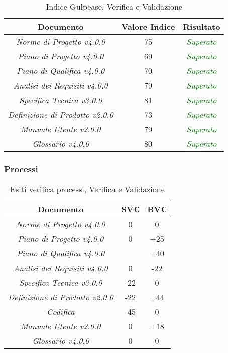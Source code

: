 \begin{table}[h]
	\begin{tabular}{|c|c|c|}
		\hline 
		\textbf{Documento} & \textbf{Valore Indice} & \textbf{Risultato} \\ 
		\hline
		\textit{Norme di Progetto v4.0.0} & 75 & \textcolor{green}{\textit{Superato}} \\  
		\textit{Piano di Progetto v4.0.0} & 69 & \textcolor{green}{\textit{Superato}} \\ 
		\textit{Piano di Qualifica v4.0.0} & 70 & \textcolor{green}{\textit{Superato}} \\ 
		\textit{Analisi dei Requisiti v4.0.0} & 79 & \textcolor{green}{\textit{Superato}} \\
		\textit{Specifica Tecnica v3.0.0} & 81 & \textcolor{green}{\textit{Superato}} \\ 
		\textit{Definizione di Prodotto v2.0.0} & 73 & \textcolor{green}{\textit{Superato}} \\ 
		\textit{Manuale Utente v2.0.0} & 79 & \textcolor{green}{\textit{Superato}} \\ 
		\textit{Glossario v4.0.0} & 80 & \textcolor{green}{\textit{Superato}} \\ 
		\hline 
	\end{tabular}
	\caption{Indice Gulpease, Verifica e Validazione}
\end{table}

\newpage

\subsubsection{Processi}
\label{appendice 9}
\vspace{3mm}

\begin{table}[h]
	\begin{tabular}{|c|c|c|}
		\toprule
		\textbf{Documento} & \textbf{SV\euro} & \textbf{BV\euro} \\ 
		\midrule
		\midrule
		\textit{Norme di Progetto v4.0.0} & 0 & 0 \\  
		\textit{Piano di Progetto v4.0.0} & 0 & +25 \\ 
		\textit{Piano di Qualifica v4.0.0} & & +40 \\ 
		\textit{Analisi dei Requisiti v4.0.0} & 0 & -22 \\
		\textit{Specifica Tecnica v3.0.0} & -22 & 0 \\ 
		\textit{Definizione di Prodotto v2.0.0} & -22 & +44 \\
		\textit{Codifica} & -45 & 0 \\
		\textit{Manuale Utente v2.0.0} & 0 & +18 \\
		\textit{Glossario v4.0.0} & 0 & 0 \\ 
		\bottomrule
	\end{tabular}
	\caption{Esiti verifica processi, Verifica e Validazione}
\end{table}

